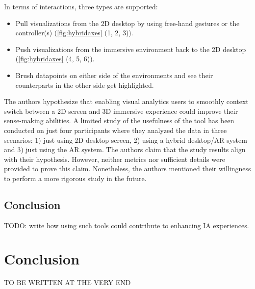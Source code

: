 \documentclass{vgtc}                          %
\begin{document}
\smallskip

\noindent In terms of interactions, three types are supported:
\begin{itemize}
	\item Pull visualizations from the 2D desktop by using free-hand gestures
	      or the controller(s) (\cref{fig:hybridaxes} (1, 2, 3)).
	\item Push visualizations from the immersive environment back to the 2D
	      desktop (\cref{fig:hybridaxes} (4, 5, 6)).
	\item Brush datapoints on either side of the environments and see their
	      counterparts in the other side get highlighted.
\end{itemize}


\noindent The authors hypothesize that enabling visual analytics users to
smoothly context switch between a 2D screen and 3D immersive experience could
improve their sense-making abilities. A limited study of the usefulness of the tool has been conducted on just four
participants where they analyzed the data in three scenarios: 1) just using 2D
desktop screen, 2) using a hybrid desktop/AR system and 3) just using the AR
system. The authors claim that the study results align with their hypothesis.
However, neither metrics nor sufficient details were provided to prove this
claim. Nonetheless, the authors mentioned their willingness to perform a more
rigorous study in the future.

\subsection{Conclusion}
TODO: write how using such tools could contribute to enhancing IA experiences.

\section{Conclusion}
TO BE WRITTEN AT THE VERY END

\printbibliography
\end{document}
